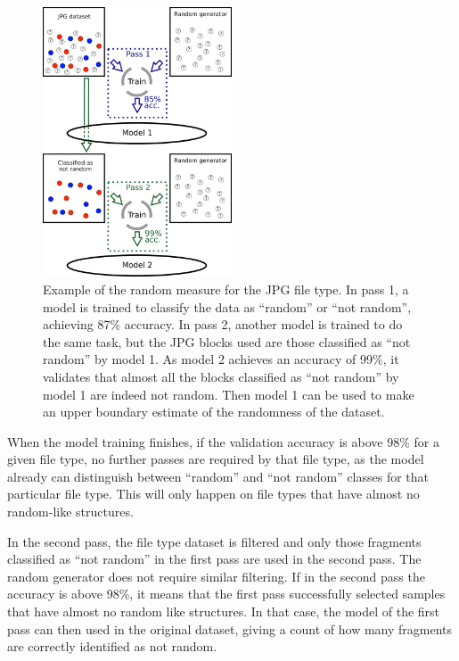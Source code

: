 \noindent
\begin{figure}[htb!]
\centering\includegraphics[width=0.5\textwidth]{content/random_measure.png}
\caption{\label{fig:randommeasure}Example of the random measure for the JPG file type. In pass 1, a model is trained to classify the data as ``random'' or ``not random'', achieving 87\% accuracy. In pass 2, another model is trained to do the same task, but the JPG blocks used are those classified as ``not random'' by model 1. As model 2 achieves an accuracy of 99\%, it validates that almost all the blocks classified as ``not random'' by model 1 are indeed not random. Then model 1 can be used to make an upper boundary estimate of the randomness of the dataset.}%
\end{figure}

When the model training finishes, if the validation accuracy is above 98\% for a given file type, no further passes are required by that file type, as the model already can distinguish between ``random'' and ``not random'' classes for that particular file type. This will only happen on file types that have almost no random-like structures.

In the second pass, the file type dataset is filtered and only those fragments classified as ``not random'' in the first pass are used in the second pass. The random generator does not require similar filtering. If in the second pass the accuracy is above 98\%, it means that the first pass successfully selected samples that have almost no random like structures. In that case, the model of the first pass can then used in the original dataset, giving a count of how many fragments are correctly identified as not random.

